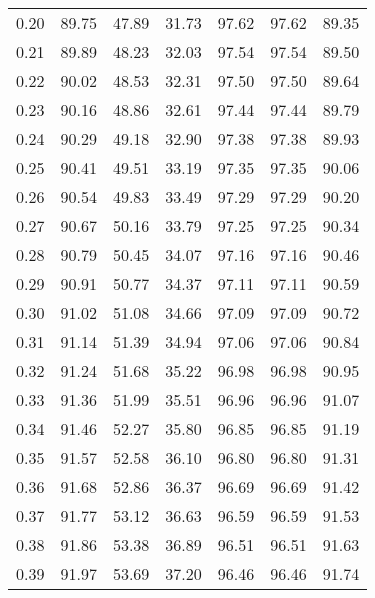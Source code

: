 \begin{tabular}{|c|c|c|c|c|c|c|}
      0.20 &     89.75 &     47.89 &      31.73 &   97.62 &      97.62 &         89.35 \\
      0.21 &     89.89 &     48.23 &      32.03 &   97.54 &      97.54 &         89.50 \\
      0.22 &     90.02 &     48.53 &      32.31 &   97.50 &      97.50 &         89.64 \\
      0.23 &     90.16 &     48.86 &      32.61 &   97.44 &      97.44 &         89.79 \\
      0.24 &     90.29 &     49.18 &      32.90 &   97.38 &      97.38 &         89.93 \\
      0.25 &     90.41 &     49.51 &      33.19 &   97.35 &      97.35 &         90.06 \\
      0.26 &     90.54 &     49.83 &      33.49 &   97.29 &      97.29 &         90.20 \\
      0.27 &     90.67 &     50.16 &      33.79 &   97.25 &      97.25 &         90.34 \\
      0.28 &     90.79 &     50.45 &      34.07 &   97.16 &      97.16 &         90.46 \\
      0.29 &     90.91 &     50.77 &      34.37 &   97.11 &      97.11 &         90.59 \\
      0.30 &     91.02 &     51.08 &      34.66 &   97.09 &      97.09 &         90.72 \\
      0.31 &     91.14 &     51.39 &      34.94 &   97.06 &      97.06 &         90.84 \\
      0.32 &     91.24 &     51.68 &      35.22 &   96.98 &      96.98 &         90.95 \\
      0.33 &     91.36 &     51.99 &      35.51 &   96.96 &      96.96 &         91.07 \\
      0.34 &     91.46 &     52.27 &      35.80 &   96.85 &      96.85 &         91.19 \\
      0.35 &     91.57 &     52.58 &      36.10 &   96.80 &      96.80 &         91.31 \\
      0.36 &     91.68 &     52.86 &      36.37 &   96.69 &      96.69 &         91.42 \\
      0.37 &     91.77 &     53.12 &      36.63 &   96.59 &      96.59 &         91.53 \\
      0.38 &     91.86 &     53.38 &      36.89 &   96.51 &      96.51 &         91.63 \\
      0.39 &     91.97 &     53.69 &      37.20 &   96.46 &      96.46 &         91.74 \\

\end{tabular}
